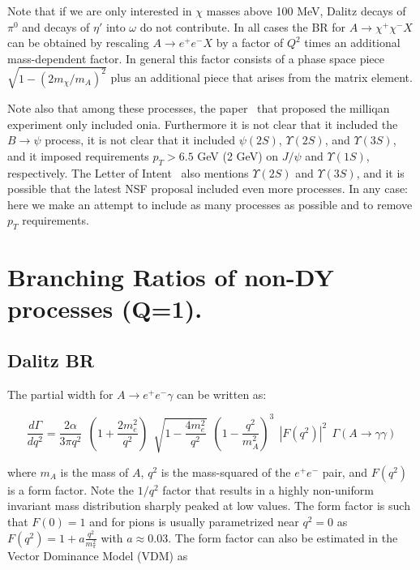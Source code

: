 \documentclass[12pt]{article}
\begin{document}
Note that if we are only interested in $\chi$ masses above 100 MeV,
Dalitz decays of $\pi^0$ and decays of $\eta'$ into $\omega$
do not contribute.
In all cases the BR for $A \to \chi^+ \chi^- X$ can be obtained
by rescaling $A \to e^+ e^- X$ by a factor of $Q^2$ times an
additional mass-dependent factor.  In general this factor consists
of a phase space piece $\sqrt{1 - (2m_\chi/m_A)^2}$ plus an additional
piece that arises from the matrix element.

Note also that among these processes, the paper~\cite{Haas:2014dda} that
proposed the milliqan experiment only included onia.  Furthermore
it is not clear that it included the $B \to \psi$ process, it
is not clear that it included $\psi(2S)$, $\Upsilon(2S)$,
and $\Upsilon(3S)$, and it imposed requirements $p_T > 6.5$ GeV (2 GeV)
on $J/\psi$ and $\Upsilon(1S)$, respectively.
The Letter of Intent~\cite{Ball:2016zrp} also mentions
$\Upsilon(2S)$ and $\Upsilon(3S)$, and it is possible that the latest
NSF proposal included even more processes.  In any case: here we make an
attempt to include as many processes as possible and to
remove $p_T$ requirements.


\section{Branching Ratios of non-DY processes (Q=1).}

\subsection{Dalitz BR}

The partial width for $A \to e^+ e^- \gamma$ can be written
as\cite{landsberg, bib:ulrik}:

\begin{equation}
\frac{d \Gamma}{d q^2} = \frac{2 \alpha}{3 \pi q^2}~~
(1+\frac{2m_e^2}{q^2})~~\sqrt{1 - \frac{4m_e^2}{q^2}}~~
(1 - \frac{q^2}{m_A^2})^3~~
|F(q^2)|^2 ~~
\Gamma(A \to \gamma \gamma) 
\label{dalitz1}
\end{equation}

\noindent where $m_A$ is the mass of $A$, $q^2$ is the mass-squared of the
$e^+e^-$ pair, 
and $F(q^2)$ is a form factor.  Note the $1/q^2$ factor that results
in a highly non-uniform invariant mass distribution sharply peaked at
low
values.
The form factor is such that $F(0)=1$ and for pions is usually
parametrized near $q^2=0$ as $F(q^2) = 1 + a \frac{q^2}{m_\pi^2}$ with
$a \approx 0.03$.  The form factor can also be estimated in the Vector
Dominance Model (VDM) as
\end{document}

